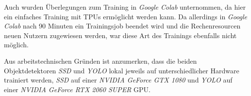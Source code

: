 Auch wurden Überlegungen zum Training in \textit{Google Colab} unternommen, da hier ein einfaches Training mit TPUs ermöglicht werden kann. Da allerdings in \textit{Google Colab} nach 90 Minuten ein Trainingsjob beendet wird und die Rechenresourcen neuen Nutzern zugewiesen werden, war diese Art des Trainings ebenfalls nicht möglich. 

Aus arbeitstechnischen Gründen ist anzumerken, dass die beiden Objektdetektoren \textit{SSD} und \textit{YOLO} lokal jeweils auf unterschiedlicher Hardware trainiert werden, \textit{SSD} auf einer \textit{NVIDIA GeForce GTX 1080} und \textit{YOLO} auf einer \textit{NVIDIA GeForce RTX 2060 SUPER} GPU.
